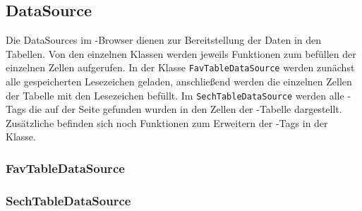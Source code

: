 \subsection{DataSource}
Die DataSources im \SECH-Browser dienen zur Bereitstellung der Daten in den Tabellen. Von den einzelnen Klassen werden jeweils Funktionen zum befüllen der einzelnen Zellen aufgerufen. In der Klasse \lstinline|FavTableDataSource| werden zunächst alle gespeicherten Lesezeichen geladen, anschließend werden die einzelnen Zellen der Tabelle mit den Lesezeichen befüllt. Im \lstinline|SechTableDataSource| werden alle \SEARCH-Tags die auf der Seite gefunden wurden in den Zellen der \SECH-Tabelle dargestellt. Zusätzliche befinden sich noch Funktionen zum Erweitern der \SEARCH-Tags in der Klasse.

\subsubsection{FavTableDataSource}
\subsubsection{SechTableDataSource}


